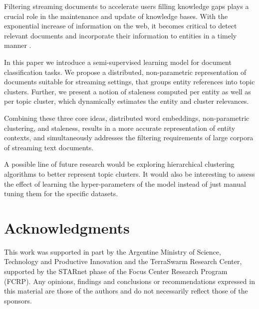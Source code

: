 \documentclass{article}
\begin{document}
Filtering streaming documents to accelerate users filling knowledge gaps plays a crucial role in the maintenance and update of knowledge bases.
With the exponential increase of information on the web, it becomes critical to detect relevant documents and incorporate their information to entities in a timely manner \cite{jingang13}.

In this paper we introduce a semi-supervised learning model for document classification tasks. We propose a distributed, non-parametric representation of documents suitable for streaming settings, that groups entity references into topic clusters. Further, we present a notion of staleness computed per entity as well as per topic cluster, which dynamically estimates the entity and cluster relevances.

Combining these three core ideas, distributed word embeddings, non-parametric clustering, and staleness, results in a more accurate representation of entity contexts, and simultaneously addresses the filtering requirements of large corpora of streaming text documents.

A possible line of future research would be exploring hierarchical clustering algorithms to better represent topic clusters. It would also be interesting to assess the effect of learning the hyper-parameters of the model instead of just manual tuning them for the specific datasets.

\section*{Acknowledgments} 
 
This work was supported in part by the Argentine Ministry of Science, Technology and Productive Innovation and the TerraSwarm Research Center, supported by the STARnet phase of the Focus Center Research Program (FCRP). Any opinions, findings and conclusions or recommendations expressed in this material are those of the authors and do not necessarily reflect those of the sponsors.



\end{document}

